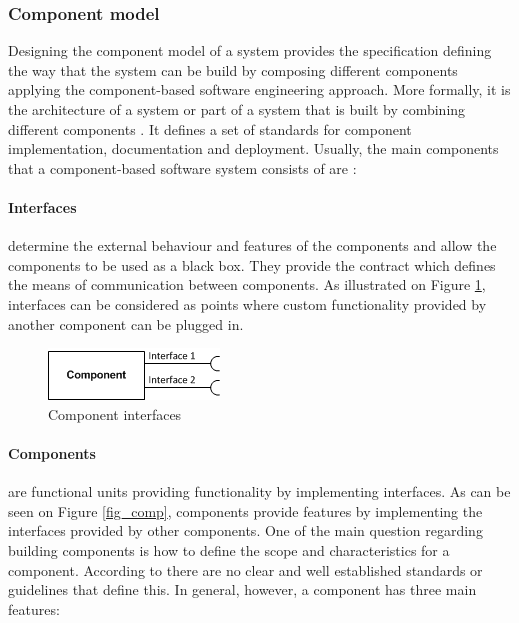 \subsubsection{Component model}

Designing the component model of a system provides the specification defining the way that the system can be build by composing different components applying the component-based software engineering approach. More formally, it is the architecture of a system or part of a system that is built by combining different components \cite{cai2000component}. It defines a set of  standards for component implementation, documentation and deployment. Usually, the main components that a component-based software system consists of are \cite{chen2009refinement}:

\paragraph{Interfaces}
	determine the external behaviour and features of the components and allow the components to be used as a black box. They provide the contract which defines the means of communication between components. As illustrated on Figure \ref{fig_intf}, interfaces can be considered as points where custom functionality provided by another component can be plugged in. 
	
	\begin{figure}[h!]
  		\centering
  		\includegraphics[scale=0.75]{plug-in/component-interfaces.png}
  		\caption{Component interfaces }
  		\label{fig_intf}
	\end{figure}

\paragraph{Components}
	are functional units providing functionality by implementing interfaces. As can be seen on Figure \ref{fig_comp}, components provide  features by implementing the interfaces provided by other components. One of the main question regarding building components is how to define the scope and characteristics for a component. According to \cite{cai2000component} there are no clear and well established standards or guidelines that define this. In general, however, a component has three main features: 

